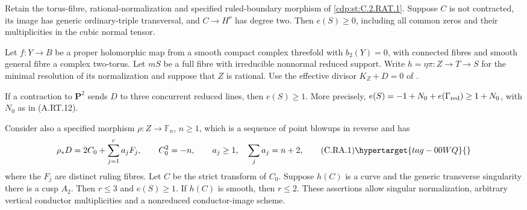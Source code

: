 
\begin{proposition}\hypertarget{tag-01CL}{}\label{cdp:st:C.2.RAT.9}


Retain the torus-fibre, rational-normalization and specified
ruled-boundary morphism of \ref{cdp:st:C.2.RAT.1}. Suppose $C$ is not
contracted, its image has generic ordinary-triple transversal,
and $C\to H^\nu$ has degree two. Then $e(S)\ge0$,
including all common zeros and their multiplicities in
the cubic normal tensor.
\end{proposition}

\begin{proposition}\hypertarget{tag-01CD}{}\label{cdp:st:C.2.RAT.1}


Let $f:Y\to B$ be a proper holomorphic map from a smooth compact
complex threefold with $b_2(Y)=0$, with connected fibres and smooth
general fibre a complex two-torus. Let $mS$ be a full fibre with
irreducible nonnormal reduced support. Write
$h=\eta\pi:Z\to T\to S$ for the minimal resolution of its
normalization and suppose that $Z$ is rational. Use the effective
divisor $K_Z+D=0$ of .

If a contraction to $\mathbf P^2$ sends $D$ to three concurrent
reduced lines, then $e(S)\ge1$. More precisely,
$e(S)=-1+N_0+e(\Gamma_{\rm red})\ge1+N_0$, with $N_0$ as in
(A.RT.12).

Consider also a specified morphism $\rho:Z\to\mathbb F_n$,
$n\ge1$, which is a sequence of point blowups in reverse and has
\[
 \rho_*D=2C_0+\sum_{j=1}^r a_jF_j,\qquad
 C_0^2=-n,\qquad
 a_j\ge1,\quad \sum_j a_j=n+2,                  \tag{C.RA.1}\hypertarget{tag-00WQ}{}\label{cdp:eq:C.RA.1}
\]
where the $F_j$ are distinct ruling fibres. Let $C$ be the
strict transform of $C_0$. Suppose $h(C)$ is a curve and the
generic transverse singularity there is a cusp $A_2$.
Then $r\le3$ and $e(S)\ge1$. If $h(C)$ is smooth, then
$r\le2$. These assertions allow singular normalization,
arbitrary vertical conductor multiplicities and a nonreduced
conductor-image scheme.
\end{proposition}

